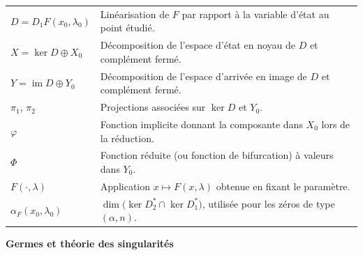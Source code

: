 \documentclass[memoire.tex]{subfiles}
\begin{document}
\begin{tabular}{@{}p{}p{}@{}}
$D=D_1F(x_0,\lambda_0)$
& Linéarisation de $F$ par rapport à la variable d'état au point étudié.\\
$X=\ker D\oplus X_0$
& Décomposition de l'espace d'état en noyau de $D$ et complément fermé.\\
$Y=\operatorname{im}D\oplus Y_0$
& Décomposition de l'espace d'arrivée en image de $D$ et complément fermé.\\
$\pi_1$, $\pi_2$
& Projections associées sur $\ker D$ et $Y_0$.\\
$\varphi$
& Fonction implicite donnant la composante dans $X_0$ lors de la réduction.\\
$\Phi$
& Fonction réduite (ou fonction de bifurcation) à valeurs dans $Y_0$.\\
$F(\cdot,\lambda)$
& Application $x\mapsto F(x,\lambda)$ obtenue en fixant le paramètre.\\
$\alpha_F(x_0,\lambda_0)$
& $\dim\!\bigl(\ker D_2^*\cap\ker D_1^*\bigr)$, utilisée pour les zéros de type $(\alpha,n)$.\\
\end{tabular}

\newpage

\noindent\textbf{Germes et théorie des singularités}
\smallskip
\end{document}
